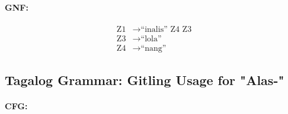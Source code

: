 \paragraph{GNF:}
\begin{equation*}
    \begin{aligned}
        \text{Z1}   & \rightarrow \text{“inalis” Z4 Z3}   \\
        \text{Z3} & \rightarrow \text{“lola”} \\
        \text{Z4} & \rightarrow \text{“nang”}
    \end{aligned}
\end{equation*}

\subsection{Tagalog Grammar: Gitling Usage for "Alas-"}
\paragraph{CFG:}

